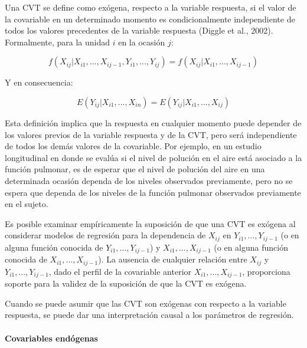 \documentclass[spanish]{article}
\numberwithin{figure}{subsection}
\numberwithin{equation}{subsection}
\numberwithin{table}{subsection}
\begin{document}
Una CVT se define como exógena, respecto a la variable respuesta, si el valor de
la covariable en un determinado momento es condicionalmente independiente de
todos los valores precedentes de la variable respuesta (Diggle et al., 2002).
Formalmente, para la unidad $i$ en la ocasión $j$:  

\begin{equation}
	\label{exogeneidad}
	f(X_{ij}|X_{i1}, ..., X_{ij-1}, Y_{i1}, ..., Y_{ij}) =
	f(X_{ij}|X_{i1}, ..., X_{ij-1})
\end{equation}

Y en consecuencia:

\begin{equation}
	\label{exogeneidad debil}
	E(Y_{ij}|X_{i1}, ..., X_{in}) = E(Y_{ij}|X_{i1}, ..., X_{ij})
\end{equation}

Esta definición implica que la respuesta en cualquier momento puede depender de
los valores previos de la variable respuesta y de la CVT, pero será
independiente de todos los demás valores de la covariable. Por ejemplo, en un
estudio longitudinal en donde se evalúa si el nivel de polución en el aire está
asociado a la función pulmonar, es de esperar que el nivel de polución del aire
en una determinada ocasión dependa de los niveles observados previamente, pero
no se espera que dependa de los niveles de la función pulmonar observados
previamente en el sujeto.

Es posible examinar empíricamente la suposición de que una CVT es exógena al
considerar modelos de regresión para la dependencia de $X_{ij}$ en
$Y_{i1}, ..., Y_{ij-1}$ (o en alguna función conocida de
$Y_{i1}, ..., Y_{ij-1}$) y $X_{i1}, ..., X_{ij-1}$ (o en alguna función conocida
de $X_{i1}, ..., X_{ij-1}$). La ausencia de cualquier relación entre $X_{ij}$ y
$Y_{i1}, ..., Y_{ij-1}$, dado el perfil de la covariable anterior
$X_{i1}, ..., X_{ij-1}$, proporciona soporte para la validez de la suposición de
que la CVT es exógena.

Cuando se puede asumir que las CVT son exógenas con respecto a la variable
respuesta, se puede dar una interpretación causal a los parámetros de regresión.

\paragraph{Covariables endógenas} \mbox{} \\
\end{document}
